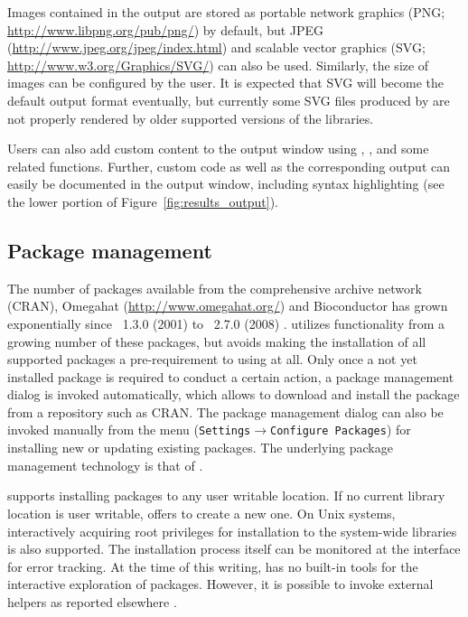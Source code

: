 Images contained in the output are stored as
portable network graphics (PNG; \url{http://www.libpng.org/pub/png/}) by
default, but JPEG (\url{http://www.jpeg.org/jpeg/index.html}) and
scalable vector graphics (SVG; \url{http://www.w3.org/Graphics/SVG/})
can also be used. Similarly, the size of 
images can be configured by the user. It is expected that SVG will
become the default output format eventually, but currently some SVG
files produced by  are not properly
rendered by older supported versions of the
 libraries.

Users can also add custom content to the output window using , , and some
related functions. Further, custom  code as well as the corresponding  output can easily be documented in
the  output window, including syntax highlighting (see the lower portion of
Figure~\ref{fig:results_output}).

\subsection{Package management}
\label{sec:package_management}
The number of  packages available from the comprehensive  archive
network (CRAN), Omegahat (\url{http://www.omegahat.org/}) and Bioconductor \citep{Gentleman2004} has grown exponentially since \, 1.3.0
(2001) to \, 2.7.0 (2008) \citep{Fox2008, Ligges2003, Visne2009}. 
utilizes functionality from a growing number of these packages, but avoids
making the installation of all supported packages a pre-requirement to using
 at all. Only once a not yet installed package is required to conduct a certain
action, a package management dialog is invoked automatically, which allows to
download and install the package from a repository such as CRAN. The package
management dialog can also be invoked manually from the menu
(\texttt{Settings$\rightarrow$Configure Packages}) for installing new or updating existing 
packages. The underlying package management technology is that of 
\citep{Ligges2003, Ripley2005}.

 supports installing packages to any user writable location. If no current
library location is user writable,  offers to create a new one. 
On Unix systems, interactively acquiring root privileges for
installation to the system-wide libraries is also supported.
The installation process
itself can be monitored at the interface for error tracking. At the time of this writing,  has no
built-in tools for the interactive exploration of  packages. However, it is
possible to invoke external helpers as reported elsewhere \citep{Zhang2004}.


